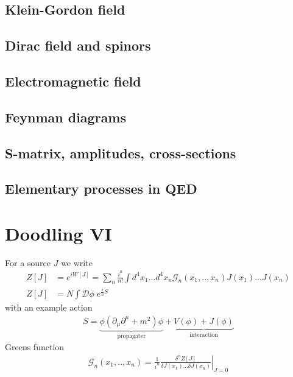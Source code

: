 \documentclass[10pt,a4paper]{book}
\theoremstyle{definition}
\begin{document}
\section{Klein-Gordon field}
\section{Dirac field and spinors}
\section{Electromagnetic field}
\section{Feynman diagrams}
\section{S-matrix, amplitudes, cross-sections}
\section{Elementary processes in QED}



\newpage
\chapter{Doodling VI}
For a source $J$ we write
\begin{align}
Z[J]&=e^{iW[J]}=\sum_n\frac{i^n}{n!}\int d^4x_1...d^4x_n\mathcal{G}_n(x_1,..,x_n)J(x_1)...J(x_n)\\
Z[J]&=N\int\mathcal{D}\phi\;e^{\frac{i}{h}S}
\end{align}
with an example action
\begin{align}
S=\underbrace{\phi(\partial_\mu\partial^\mu+m^2)\phi}_\text{propagater}+\underbrace{V(\phi)+J(\phi)}_\text{interaction}
\end{align}
Greens function
\begin{align}
\mathcal{G}_n(x_1,..,x_n)=\left.\frac{1}{i^n}\frac{\delta^n Z[J]}{\delta J(x_1)...\delta J(x_n)}\right|_{J=0}
\end{align}


\newpage
\end{document}
